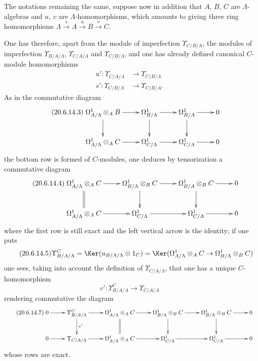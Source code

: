 \begin{env}[20.6.14]
\label{0.20.6.14}
The notations remaining the same, suppose now in addition that $A$, $B$, $C$ are $\Lambda$-algebras and $u$, $v$ are $\Lambda$-homomorphisms, which amounts to giving three ring homomorphisms $\Lambda\xrightarrow{s}A\xrightarrow{u}B\xrightarrow{v}C$.

One has therefore, apart from the module of imperfection $\Upsilon_{C/B/A}$, the modules of imperfection $\Upsilon_{B/A/\Lambda}$, $\Upsilon_{C/A/\Lambda}$ and $\Upsilon_{C/B/\Lambda}$, and one has already defined canonical $C$-module homomorphisms 
\begin{align}
\tag{20.6.14.1}
  \label{0.20.6.14.1}
  u':\Upsilon_{C/A/\Lambda}&\to\Upsilon_{C/B/\Lambda} \\
\tag{20.6.14.2}
  \label{0.20.6.14.2}
  s':\Upsilon_{C/B/\Lambda}&\to\Upsilon_{C/B/A}.
\end{align}
As in the commutative diagram 
\begin{equation}
\tag{20.6.14.3}
  \label{0.20.6.14.3}
\xymatrix{
  \Omega^1_{A/\Lambda}\otimes_A B \ar[r] \ar[d] & \Omega^1_{B/\Lambda} \ar[r] \ar[d] & \Omega^1_{B/A} \ar[r] \ar[d] & 0 \\
  \Omega^1_{A/\Lambda}\otimes_A C \ar[r] & \Omega^1_{C/\Lambda} \ar[r] & \Omega^1_{C/A} \ar[r] & 0
}
\end{equation}
the bottom row is formed of $C$-modules, one deduces by tensorization a commutative diagram
\begin{equation}
\tag{20.6.14.4}
  \label{0.20.6.14.4}
\xymatrix{
  \Omega^1_{A/\Lambda}\otimes_A C \ar[r] \ar@{=}[d] & \Omega^1_{B/\Lambda}\otimes_B C \ar[r] \ar[d] & \Omega^1_{B/A}\otimes_B C \ar[r] \ar[d] & 0 \\
  \Omega^1_{A/\Lambda}\otimes_A C \ar[r] & \Omega^1_{C/\Lambda} \ar[r] & \Omega^1_{C/A} \ar[r] & 0
}
\end{equation}
where the first row is still exact and the left vertical arrow is the identity; if one puts
\begin{equation}
\tag{20.6.14.5}
  \label{0.20.6.14.5}
  \Upsilon^C_{B/A/\Lambda}=\Ker(u_{B/A/\Lambda}\otimes 1_C)=\Ker(\Omega^1_{A/\Lambda}\otimes_A C\to\Omega^1_{B/\Lambda}\otimes_B C)
\end{equation}
one sees, taking into account the definition of $\Upsilon_{C/A/\Lambda}$, that one has a unique $C$-homomorphism
\begin{equation}
\tag{20.6.14.6}
  \label{0.20.6.14.6}
  v':\Upsilon^C_{B/A/\Lambda}\to\Upsilon_{C/A/\Lambda}
\end{equation}
rendering commutative the diagram
\begin{equation}
\tag{20.6.14.7}
  \label{0.20.6.14.7}
\xymatrix{
  0 \ar[r] & \Upsilon^C_{B/A/\Lambda} \ar[r] \ar[d]^{v'} & \Omega^1_{A/\Lambda}\otimes_A C \ar[r] \ar@{=}[d] & \Omega^1_{B/\Lambda}\otimes_B C \ar[r] \ar[d] & \Omega^1_{B/A}\otimes_B C \ar[r] \ar[d] & 0 \\
  0 \ar[r] & \Upsilon_{C/A/\Lambda} \ar[r] & \Omega^1_{A/\Lambda}\otimes_A C \ar[r] & \Omega^1_{C/\Lambda} \ar[r] & \Omega^1_{C/A} \ar[r] & 0
}
\end{equation}
whose rows are exact.


\end{env}
